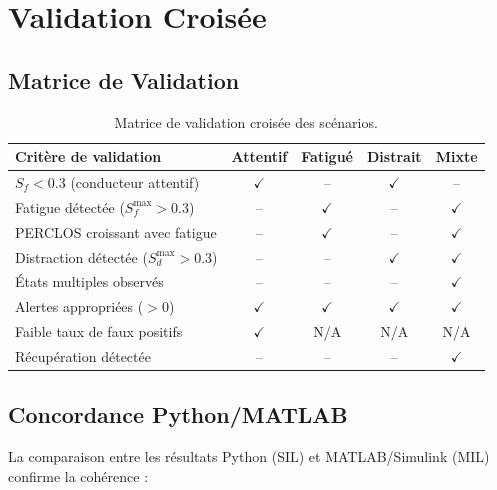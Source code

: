 \documentclass[12pt,a4paper,twoside]{report}
\begin{document}
\section{Validation Croisée}

\subsection{Matrice de Validation}

\begin{table}[H]
\centering
\caption{Matrice de validation croisée des scénarios.}
\label{tab:validation_croisee}
\renewcommand{\arraystretch}{1.3}
\begin{tabular}{|l|c|c|c|c|}
\hline
\rowcolor{stellantisblue!15}
\textbf{Critère de validation} & \textbf{Attentif} & \textbf{Fatigué} & \textbf{Distrait} & \textbf{Mixte} \\
\hline
$S_f < 0.3$ (conducteur attentif) & \cellcolor{green!20} $\checkmark$ & -- & \cellcolor{green!20} $\checkmark$ & -- \\
\hline
Fatigue détectée ($S_f^{\max} > 0.3$) & -- & \cellcolor{green!20} $\checkmark$ & -- & \cellcolor{green!20} $\checkmark$ \\
\hline
PERCLOS croissant avec fatigue & -- & \cellcolor{green!20} $\checkmark$ & -- & \cellcolor{green!20} $\checkmark$ \\
\hline
Distraction détectée ($S_d^{\max} > 0.3$) & -- & -- & \cellcolor{green!20} $\checkmark$ & \cellcolor{green!20} $\checkmark$ \\
\hline
États multiples observés & -- & -- & -- & \cellcolor{green!20} $\checkmark$ \\
\hline
Alertes appropriées ($> 0$) & \cellcolor{green!20} $\checkmark$ & \cellcolor{green!20} $\checkmark$ & \cellcolor{green!20} $\checkmark$ & \cellcolor{green!20} $\checkmark$ \\
\hline
Faible taux de faux positifs & \cellcolor{green!20} $\checkmark$ & N/A & N/A & N/A \\
\hline
Récupération détectée & -- & -- & -- & \cellcolor{green!20} $\checkmark$ \\
\hline
\end{tabular}
\end{table}

\subsection{Concordance Python/MATLAB}

La comparaison entre les résultats Python (SIL) et MATLAB/Simulink (MIL) confirme la cohérence :
\end{document}
